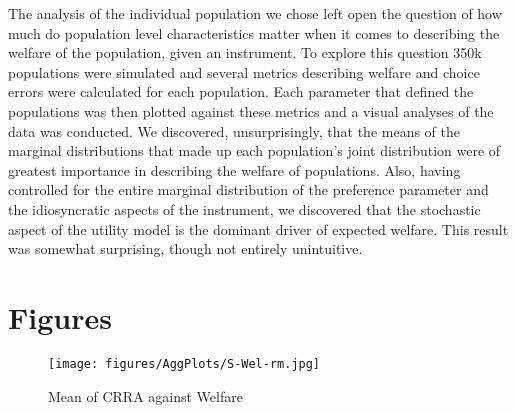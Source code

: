 \documentclass[../main.tex]{subfiles}
\begin{document}
The analysis of the individual population we chose left open the question of how much do population level characteristics matter when it comes to describing the welfare of the population, given an instrument.
To explore this question 350k populations were simulated and several metrics describing welfare and choice errors were calculated for each population.
Each parameter that defined the populations was then plotted against these metrics and a visual analyses of the data was conducted.
We discovered, unsurprisingly, that the means of the marginal distributions that made up each population's joint distribution were of greatest importance in describing the welfare of populations.
Also, having controlled for the entire marginal distribution of the preference parameter and the idiosyncratic aspects of the instrument, we discovered that the stochastic aspect of the utility model is the dominant driver of expected welfare.
This result was somewhat surprising, though not entirely unintuitive.




\newpage

\section{Figures}

\begin{figure}[hp!]
	\center
	\caption{Mean of CRRA against Welfare}
	\texttt{[image: figures/AggPlots/S-Wel-rm.jpg]}
	\label{fig:S-Wel-rm}
\end{figure}
\end{document}
